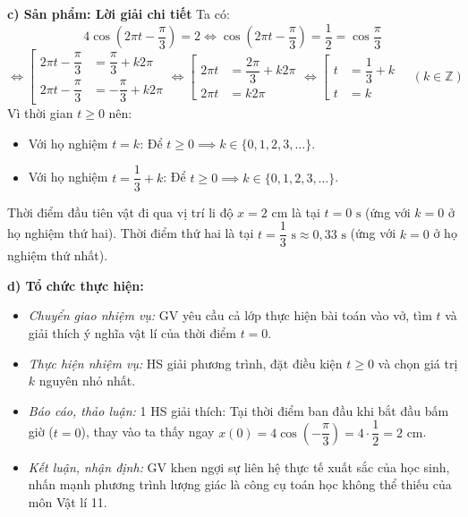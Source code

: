 \documentclass[12pt, a4paper]{article}
\begin{document}
\noindent \textbf{c) Sản phẩm: Lời giải chi tiết}  
Ta có:  
$$4\cos\left(2\pi t - \dfrac{\pi}{3}\right) = 2 \iff \cos\left(2\pi t - \dfrac{\pi}{3}\right) = \dfrac{1}{2} = \cos\dfrac{\pi}{3}$$  
$$\iff \left[\begin{aligned} 2\pi t - \dfrac{\pi}{3} &= \dfrac{\pi}{3} + k2\pi \\ 2\pi t - \dfrac{\pi}{3} &= -\dfrac{\pi}{3} + k2\pi \end{aligned}\right. \iff \left[\begin{aligned} 2\pi t &= \dfrac{2\pi}{3} + k2\pi \\ 2\pi t &= k2\pi \end{aligned}\right. \iff \left[\begin{aligned} t &= \dfrac{1}{3} + k \\ t &= k \end{aligned}\right. \quad (k \in \mathbb{Z})$$  
Vì thời gian $t \ge 0$ nên:  
\begin{itemize}  
    \item Với họ nghiệm $t = k$: Để $t \ge 0 \implies k \in \{0, 1, 2, 3, \dots\}$.  
    \item Với họ nghiệm $t = \dfrac{1}{3} + k$: Để $t \ge 0 \implies k \in \{0, 1, 2, 3, \dots\}$.  
\end{itemize}  
Thời điểm đầu tiên vật đi qua vị trí li độ $x = 2\text{ cm}$ là tại $t = 0\text{ s}$ (ứng với $k = 0$ ở họ nghiệm thứ hai).  
Thời điểm thứ hai là tại $t = \dfrac{1}{3}\text{ s} \approx 0{,}33\text{ s}$ (ứng với $k = 0$ ở họ nghiệm thứ nhất).  
  
\noindent \textbf{d) Tổ chức thực hiện:}  
\begin{itemize}[leftmargin=0.8cm]  
    \item \textit{Chuyển giao nhiệm vụ:} GV yêu cầu cả lớp thực hiện bài toán vào vở, tìm $t$ và giải thích ý nghĩa vật lí của thời điểm $t = 0$.  
    \item \textit{Thực hiện nhiệm vụ:} HS giải phương trình, đặt điều kiện $t \ge 0$ và chọn giá trị $k$ nguyên nhỏ nhất.  
    \item \textit{Báo cáo, thảo luận:} 1 HS giải thích: Tại thời điểm ban đầu khi bắt đầu bấm giờ ($t = 0$), thay vào ta thấy ngay $x(0) = 4\cos\left(-\dfrac{\pi}{3}\right) = 4 \cdot \dfrac{1}{2} = 2\text{ cm}$.  
    \item \textit{Kết luận, nhận định:} GV khen ngợi sự liên hệ thực tế xuất sắc của học sinh, nhấn mạnh phương trình lượng giác là công cụ toán học không thể thiếu của môn Vật lí 11.  
\end{itemize}  
  
\end{document}
